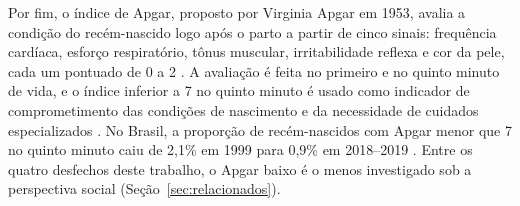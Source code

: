 

Por fim, o índice de Apgar, proposto por Virginia Apgar em 1953, avalia a condição do recém-nascido logo após o parto a partir de cinco sinais: frequência cardíaca, esforço respiratório, tônus muscular, irritabilidade reflexa e cor da pele, cada um pontuado de 0 a 2 \cite{apgar1953}. A avaliação é feita no primeiro e no quinto minuto de vida, e o índice inferior a 7 no quinto minuto é usado como indicador de comprometimento das condições de nascimento e da necessidade de cuidados especializados \cite{magalhaes2023}.
No Brasil, a proporção de recém-nascidos com Apgar menor que 7 no quinto minuto caiu de 2,1\% em 1999 para 0,9\% em 2018--2019 \cite{magalhaes2023}. 
Entre os quatro desfechos deste trabalho, o Apgar baixo é o menos investigado sob a perspectiva social (Seção~\ref{sec:relacionados}).

